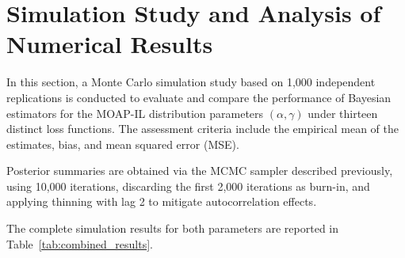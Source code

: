 \documentclass[twoside]{article}
\begin{document}
\section{Simulation Study and Analysis of Numerical Results}

In this section, a Monte Carlo simulation study based on 1,000 independent replications is conducted to evaluate and compare the performance of Bayesian estimators for the MOAP-IL distribution parameters $(\alpha,\gamma)$ under thirteen distinct loss functions. The assessment criteria include the empirical mean of the estimates, bias, and mean squared error (MSE). 

Posterior summaries are obtained via the MCMC sampler described previously, using 10,000 iterations, discarding the first 2,000 iterations as burn-in, and applying thinning with lag 2 to mitigate autocorrelation effects.

The complete simulation results for both parameters are reported in Table~\ref{tab:combined_results}.
\end{document}
